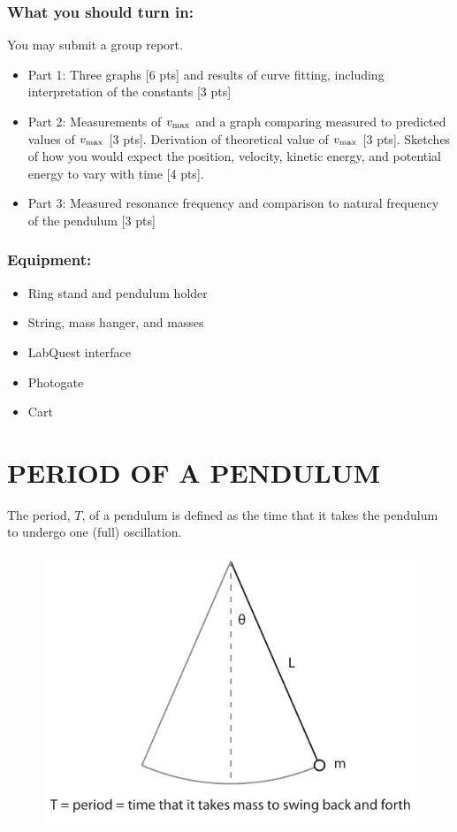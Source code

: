 \documentclass[11pt,letterpaper]{article}
\begin{document}
\subsubsection*{What you should turn in:} 
You may submit a group report.
\begin{itemize}
\setlength{\parskip}{3pt}
\item Part 1: Three graphs [6 pts] and results of curve fitting, including interpretation of the constants [3 pts]
\item Part 2: Measurements of $v_{\rm{max}}$ and a graph comparing measured to predicted values of $v_{\rm{max}}$ [3 pts]. Derivation of theoretical value of $v_{\rm{max}}$ [3 pts]. Sketches of how you would expect the position, velocity, kinetic energy, and potential energy to vary with time [4 pts].
\item Part 3: Measured resonance frequency and comparison to natural frequency of the pendulum [3 pts]
\end{itemize}

\subsubsection*{Equipment:}
\begin{itemize}
\setlength{\parskip}{3pt}
\item Ring stand and pendulum holder
\item String, mass hanger, and masses
\item LabQuest interface
\item Photogate
\item Cart
\end{itemize}

\section{PERIOD OF A PENDULUM}
The period, $T$, of a pendulum is defined as the time that it takes the pendulum to undergo one (full) oscillation. 

\begin{figure}[h]
\begin{center}
\includegraphics[]{./pendulum}
\end{center}
\end{figure}
\end{document}
